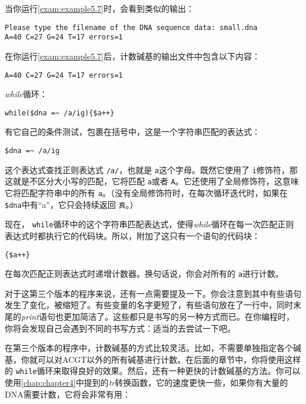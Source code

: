 当你运行\autoref{exam:example5.7}时，会看到类似的输出：

\begin{lstlisting}
Please type the filename of the DNA sequence data: small.dna
A=40 C=27 G=24 T=17 errors=1
\end{lstlisting}

在你运行\autoref{exam:example5.7}后，计数碱基的输出文件中包含以下内容：

\begin{lstlisting}
A=40 C=27 G=24 T=17 errors=1
\end{lstlisting}

\textit{while}循环：

\begin{lstlisting}
while($dna =~ /a/ig){$a++} 
\end{lstlisting}

有它自己的条件测试，包裹在括号中，这是一个字符串匹配的表达式：

\begin{lstlisting}
$dna =~ /a/ig 
\end{lstlisting}

这个表达式查找正则表达式 \verb|/a/|，也就是 \verb|a|这个字母。既然它使用了 \verb|i|修饰符，那这就是不区分大小写的匹配，它将匹配 \verb|a|或者 \verb|A|。它还使用了全局修饰符，这意味它将匹配字符串中的所有 \verb|a|。（没有全局修饰符时，在每次循环迭代时，如果在 \verb|$dna|中有“a”，它只会持续返回 \verb|真|。）

现在， \verb|while|循环中的这个字符串匹配表达式，使得\textit{while}循环在每一次匹配正则表达式时都执行它的代码块。所以，附加了这只有一个语句的代码块：

\begin{lstlisting}
{$a++}
\end{lstlisting}

在每次匹配正则表达式时递增计数器。换句话说，你会对所有的 \verb|a|进行计数。

对于这第三个版本的程序来说，还有一点需要提及一下。你会注意到其中有些语句发生了变化，被缩短了。有些变量的名字更短了，有些语句放在了一行中，同时末尾的\textit{print}语句也更加简洁了。这些都只是书写的另一种方式而已。在你编程时，你将会发现自己会遇到不同的书写方式：适当的去尝试一下吧。

在第三个版本的程序中，计数碱基的方式比较灵活。比如，不需要单独指定各个碱基，你就可以对ACGT以外的所有碱基进行计数。在后面的章节中，你将使用这样的 \verb|while|循环来取得良好的效果。然后，还有一种更快的计数碱基的方法。你可以使用\autoref{chap:chapter4}中提到的\textit{tr}转换函数，它的速度更快一些，如果你有大量的DNA需要计数，它将会非常有用：

